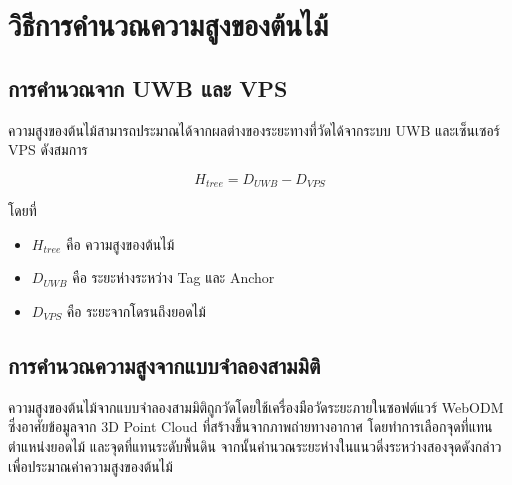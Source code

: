 \section{วิธีการคำนวณความสูงของต้นไม้}

\subsection{การคำนวณจาก UWB และ VPS}

ความสูงของต้นไม้สามารถประมาณได้จากผลต่างของระยะทางที่วัดได้จากระบบ UWB และเซ็นเซอร์ VPS ดังสมการ

\begin{equation}
    H_{tree} = D_{UWB} - D_{VPS}
    \label{eq:tree_height}
\end{equation}

โดยที่

\begin{itemize}
    \item $H_{tree}$ คือ ความสูงของต้นไม้
    \item $D_{UWB}$ คือ ระยะห่างระหว่าง Tag และ Anchor
    \item $D_{VPS}$ คือ ระยะจากโดรนถึงยอดไม้
\end{itemize}

\subsection{การคำนวณความสูงจากแบบจำลองสามมิติ}
ความสูงของต้นไม้จากแบบจำลองสามมิติถูกวัดโดยใช้เครื่องมือวัดระยะภายในซอฟต์แวร์ WebODM ซึ่งอาศัยข้อมูลจาก 3D Point Cloud ที่สร้างขึ้นจากภาพถ่ายทางอากาศ โดยทำการเลือกจุดที่แทนตำแหน่งยอดไม้ และจุดที่แทนระดับพื้นดิน จากนั้นคำนวณระยะห่างในแนวดิ่งระหว่างสองจุดดังกล่าวเพื่อประมาณค่าความสูงของต้นไม้
